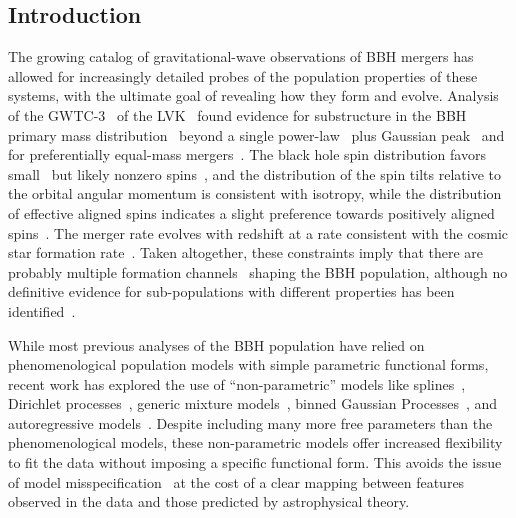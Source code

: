 \begin{refsection}
\section{Introduction}
The growing catalog of gravitational-wave observations of \acf{BBH} mergers has allowed for increasingly detailed probes of the population properties of these systems, with the ultimate goal of revealing how they form and evolve. Analysis of the \acf{GWTC-3}~\cite{LIGOScientific:2021djp} of the \acf{LVK}~\cite{TheLIGOScientific:2014jea, TheVirgo:2014hva, Aso:2013eba, Somiya:2011np, KAGRA:2020tym} found evidence for substructure in the \ac{BBH} primary mass distribution~\cite{KAGRA:2021duu, Tiwari:2020otp, Edelman:2021zkw} beyond a single power-law~\cite{Fishbach:2017zga} plus Gaussian peak~\cite{Talbot:2018cva} and for preferentially equal-mass mergers~\cite{Fishbach:2019bbm, Farah:2023swu}. The black hole spin distribution favors small~\cite{Wysocki:2018} but likely nonzero spins~\cite{Biscoveanu:2020are, Callister:2022qwb, Tong:2022iws, Mould:2022xeu, Galaudage:2021rkt, Roulet:2021hcu}, and the distribution of the spin tilts relative to the orbital angular momentum is consistent with isotropy, while the distribution of effective aligned spins indicates a slight preference towards positively aligned spins~\cite{Roulet:2021hcu, Miller:2020zox, KAGRA:2021duu, Vitale:2022dpa, Golomb:2022bon}. The merger rate evolves with redshift at a rate consistent with the cosmic star formation rate~\cite{Fishbach:2021yvy}. Taken altogether, these constraints imply that there are probably multiple formation channels~\cite{Zevin:2020gbd, Cheng:2023ddt, Wong:2020ise} shaping the \ac{BBH} population, although no definitive evidence for sub-populations with different properties has been identified~\cite{Baibhav:2022qxm, Godfrey:2023oxb, Wang:2022gnx}.

While most previous analyses of the \ac{BBH} population have relied on phenomenological population models with simple parametric functional forms, recent work has explored the use of ``non-parametric'' models like splines~\cite{Edelman:2022ydv, Golomb:2022bon}, Dirichlet processes~\cite{Rinaldi:2021bhm}, generic mixture models~\cite{Tiwari:2020otp,Tiwari:2020vym,Tiwari:2021yvr}, binned Gaussian Processes~\cite{Foreman-Mackey_2014, KAGRA:2021duu, Ray:2023upk}, and autoregressive models~\cite{Callister:2023tgi}. Despite including many more free parameters than the phenomenological models, these non-parametric models offer increased flexibility to fit the data without imposing a specific functional form. This avoids the issue of model misspecification~\cite[e.g.,][]{Romero-Shaw:2022ctb} at the cost of a clear mapping between features observed in the data and those predicted by astrophysical theory.


\end{refsection}
